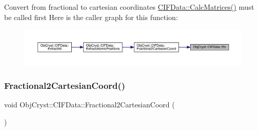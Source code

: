 Convert from fractional to cartesian coordinates \mbox{\hyperlink{class_obj_cryst_1_1_c_i_f_data_a51e099b2881e73eb776855177aed4ca9}{C\+I\+F\+Data\+::\+Calc\+Matrices()}} must be called first Here is the caller graph for this function\+:
\nopagebreak
\begin{figure}[H]
\begin{center}
\leavevmode
\includegraphics[width=350pt]{class_obj_cryst_1_1_c_i_f_data_ab90f52bca82121f6ddc5efdddf5ac7bc_icgraph}
\end{center}
\end{figure}
\mbox{\label{class_obj_cryst_1_1_c_i_f_data_a8217fa94ba5f6291b566d43123162d9c}} 
\subsubsection{\texorpdfstring{Fractional2CartesianCoord()}{Fractional2CartesianCoord()}}
{\footnotesize\ttfamily void Obj\+Cryst\+::\+C\+I\+F\+Data\+::\+Fractional2\+Cartesian\+Coord (\begin{DoxyParamCaption}{ }\end{DoxyParamCaption})}

